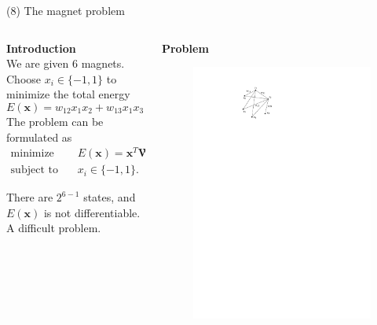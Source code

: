\documentclass[11pt, aspectratio=149]{beamer}
\theoremstyle{plain}
\begin{document}
\begin{frame}[fragile, t]{(8) The magnet problem}
	\begin{columns}
		\begin{column}{0.6\textwidth}
			\textbf{Introduction}\\ \vspace*{0.5em} 
			We are given $6$ magnets.
			Choose $x_i \in \{-1, 1\}$
			to minimize the total energy
			\begin{equation*}
				E(\mathbf{x}) = w_{12} x_1 x_2 + w_{13} x_1 x_3 + \cdots + w_{56} x_5 x_6.
			\end{equation*}
			The problem can be formulated as
			\begin{align*}
			\text{minimize } \quad & E(\mathbf{x}) = \mathbf{x}^T \mathbf{W} \mathbf{x}  \\
			\text{subject to } \quad & x_i \in \{-1, 1\}  .
			\end{align*}
			
			There are $2^{6-1}$ states, and $E(\mathbf{x})$ is not differentiable.
			A difficult problem.
		\end{column}
		\begin{column}{0.4\textwidth}%
			\textbf{Problem}\\
			\begin{figure}
				\centering
				\includegraphics[width=0.8\linewidth]{figs/magnet_problem.pdf}
			\end{figure}
		\end{column}
	\end{columns}
\end{frame}
\end{document}
